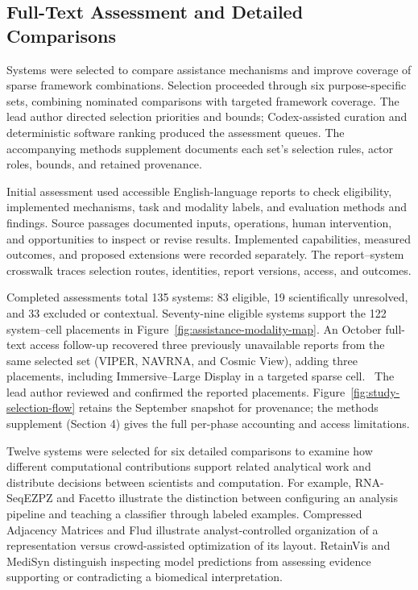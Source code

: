 \subsection{Full-Text Assessment and Detailed Comparisons}
\label{sec:methodology-assessment}
Systems were selected to compare assistance mechanisms and improve coverage of sparse framework combinations. Selection proceeded through six purpose-specific sets, combining nominated comparisons with targeted framework coverage. The lead author directed selection priorities and bounds; Codex-assisted curation and deterministic software ranking produced the assessment queues. The accompanying methods supplement documents each set's selection rules, actor roles, bounds, and retained provenance.

Initial assessment used accessible English-language reports to check eligibility, implemented mechanisms, task and modality labels, and evaluation methods and findings. Source passages documented inputs, operations, human intervention, and opportunities to inspect or revise results. Implemented capabilities, measured outcomes, and proposed extensions were recorded separately. The report--system crosswalk traces selection routes, identities, report versions, access, and outcomes.

Completed assessments total 135 systems: 83 eligible, 19 scientifically unresolved, and 33 excluded or contextual. Seventy-nine eligible systems support the 122 system--cell placements in Figure~\ref{fig:assistance-modality-map}. An October full-text access follow-up recovered three previously unavailable reports from the same selected set (VIPER, NAVRNA, and Cosmic View), adding three placements, including Immersive--Large Display in a targeted sparse cell.~\cite{NewVIPER1998,NewNAVRNA2006,NewCosmic2025} The lead author reviewed and confirmed the reported placements. Figure~\ref{fig:study-selection-flow} retains the September snapshot for provenance; the methods supplement (Section 4) gives the full per-phase accounting and access limitations.

Twelve systems were selected for six detailed comparisons to examine how different computational contributions support related analytical work and distribute decisions between scientists and computation. For example, RNA-SeqEZPZ and Facetto illustrate the distinction between configuring an analysis pipeline and teaching a classifier through labeled examples. Compressed Adjacency Matrices and Flud illustrate analyst-controlled organization of a representation versus crowd-assisted optimization of its layout. RetainVis and MediSyn distinguish inspecting model predictions from assessing evidence supporting or contradicting a biomedical interpretation.

